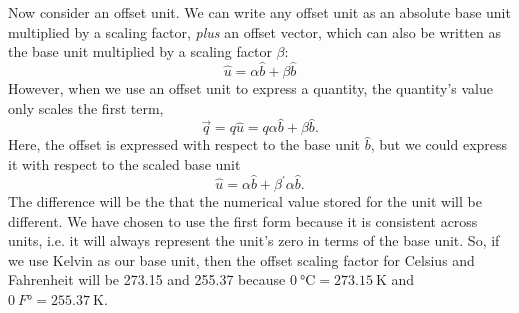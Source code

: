 \documentclass[letterpaper,10pt]{article}
\begin{document}
Now consider an offset unit. We can write any offset unit as an absolute base unit multiplied by a scaling factor, \emph{plus} an
offset vector, which can also be written as the base unit multiplied by a scaling factor $\beta$:
\begin{equation}
        \hat{u} = \alpha \hat{b} + \beta \hat{b}
\end{equation}
However, when we use an offset unit to express a quantity, the quantity's value only scales the first term,
\begin{equation}
        \vec{q} = q \hat{u} = q \alpha \hat{b} + \beta \hat{b}.
\end{equation}
Here, the offset is expressed with respect to the base unit $\hat{b}$, but we could express it with respect to the scaled base unit
\begin{equation}
        \hat{u} = \alpha \hat{b} + \beta^\prime \alpha \hat{b}.
\end{equation}
The difference will be the that the numerical value stored for the unit will be different. We have chosen to use the first form because it is
consistent across units, i.e. it will always represent the unit's zero in terms of the base unit. So, if we use Kelvin as our base unit,
then the offset scaling factor for Celsius and Fahrenheit will be 273.15 and 255.37 because $\SI{0}{\celsius} = \SI{273.15}{\kelvin}$ and $\SI{0}{F\degree} = \SI{255.37}{\kelvin}$.
\end{document}
